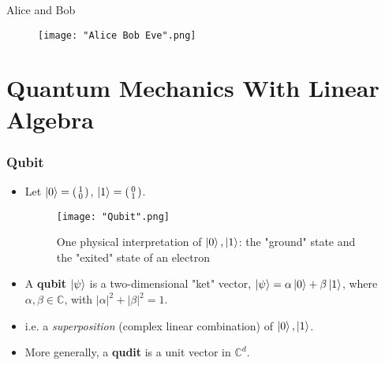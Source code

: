 \documentclass[handout, 10 pt]{beamer}
\newcommand{\icol}[1]{%
  \left(\begin{smallmatrix}#1\end{smallmatrix}\right)%
}
\begin{document}
\begin{frame}{Alice and Bob}
\begin{figure}[h]
    \centering
    \texttt{[image: "Alice Bob Eve".png]}
    \label{fig:Alice Bob Eve}
\end{figure}    
\end{frame}

\section{Quantum Mechanics With Linear Algebra}

\begin{comment}
Mathematically, a {\emph{qubit}} is a unit vector in a two-dimensional complex vector space.  In the same way that the bit is the fundamental unit of classical computation and information, the quantum bit, or qubit is the basic unit of quantum information.  With this motivation in mind, we sometimes write $\ket{0} = \icol{1\\0}$, and $\ket{1} = \icol{0\\1}$. Note that the symbols "$\ket{0}$" and "$\ket{1}$" are read "ket one" and "ket two".\footnote{We are using so-called Bra-ket notation common in quantum mechanics}  While bits may only take the values $0$ or $1$, a qubit is a complex linear combination, or \textit{superposition} of $\ket{0}$ and $\ket{1}$ with norm equal to one. 
\end{comment}

\begin{frame}
\frametitle{Qubit}

\begin{itemize}
    \item Let $\ket{0} = \icol{1\\0}$, $\ket{1} = \icol{0\\1}$.
    \begin{figure}[h]
    \centering
    \texttt{[image: "Qubit".png]}
    \caption{One physical interpretation of $\ket{0},\ket{1}$: the "ground" state and the "exited" state of an electron}
    \label{fig: qubit}
    \end{figure}
    \pause
    \item A \textbf{qubit} $\ket{\psi}$ is a two-dimensional "ket" vector, $\ket{\psi}=\alpha\ket{0}+\beta\ket{1}$, where $\alpha,\beta\in\mathbb{C}$, with $|\alpha|^2+|\beta|^2=1$.
    \item i.e. a \textit{superposition} (complex linear combination) of $\ket{0}, \ket{1}$.
    \pause
    \item More generally, a \textbf{qudit} is a unit vector in ${\mathbb{C}}^d$.
    \end{itemize}
\end{frame}
\end{document}

